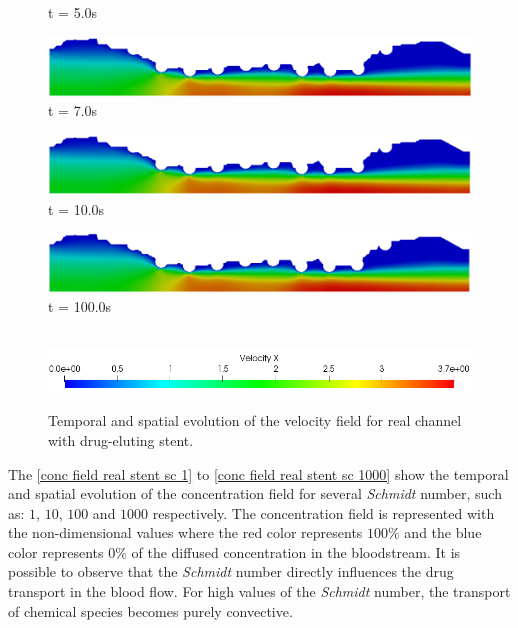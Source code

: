 \begin{figure}[H]
\begin{minipage}{.50\linewidth}
      t = 5.0s
     \end{minipage}%
     \begin{minipage}{.50\linewidth}
      \centering
      \includegraphics[scale=0.18]{./02_chaps/cap_solution/figure/vel_RealStrut6.png}\\
      t = 7.0s
     \end{minipage}
     \begin{minipage}{.50\linewidth}
     \medskip
      \centering
      \includegraphics[scale=0.18]{./02_chaps/cap_solution/figure/vel_RealStrut7.png}\\
      t = 10.0s
     \end{minipage}%
     \begin{minipage}{.50\linewidth}
     \medskip
      \centering
      \includegraphics[scale=0.18]{./02_chaps/cap_solution/figure/vel_RealStrut8.png}\\
      t = 100.0s
     \end{minipage}\\[10pt]
      \centering
      \includegraphics[scale=0.5]{./02_chaps/cap_solution/figure/vel_RealStrutScale.png}\\
     \medskip
     \caption{
Temporal and spatial evolution of the velocity field for real channel with
drug-eluting stent.}
     \label{velocity field real stent}
\end{figure}





\vspace{1cm}
The \ref{conc field real stent sc 1} to
\ref{conc field real stent sc 1000} show the temporal and spatial evolution 
of the concentration field for several \textit{Schmidt} number, 
such as: $1$, $10$, $100$ and $1000$ respectively. The concentration field is 
represented with the non-dimensional values where the red color 
represents $100$\% and the blue color represents $0$\% 
of the diffused concentration in the bloodstream. 
It is possible to observe that the \textit{Schmidt} number directly 
influences the drug transport in the blood flow. 
For high values of the \textit{Schmidt} number, 
the transport of chemical species becomes purely convective.


